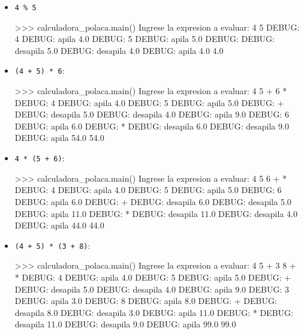 \begin{itemize}
\item \verb|4 % 5|
\begin{codigo-python-sn}
>>> calculadora_polaca.main()
Ingrese la expresion a evaluar: 4 5 %
DEBUG: 4
DEBUG: apila  4.0
DEBUG: 5
DEBUG: apila  5.0
DEBUG: %
DEBUG: desapila  5.0
DEBUG: desapila  4.0
DEBUG: apila  4.0
4.0
\end{codigo-python-sn}

\item \verb|(4 + 5) * 6|:

\begin{codigo-python-sn}
>>> calculadora_polaca.main()
Ingrese la expresion a evaluar: 4 5 + 6 *
DEBUG: 4
DEBUG: apila  4.0
DEBUG: 5
DEBUG: apila  5.0
DEBUG: +
DEBUG: desapila  5.0
DEBUG: desapila  4.0
DEBUG: apila  9.0
DEBUG: 6
DEBUG: apila  6.0
DEBUG: *
DEBUG: desapila  6.0
DEBUG: desapila  9.0
DEBUG: apila  54.0
54.0
\end{codigo-python-sn}

\item \verb|4 * (5 + 6)|:

\begin{codigo-python-sn}
>>> calculadora_polaca.main()
Ingrese la expresion a evaluar: 4 5 6 + *
DEBUG: 4
DEBUG: apila  4.0
DEBUG: 5
DEBUG: apila  5.0
DEBUG: 6
DEBUG: apila  6.0
DEBUG: +
DEBUG: desapila  6.0
DEBUG: desapila  5.0
DEBUG: apila  11.0
DEBUG: *
DEBUG: desapila  11.0
DEBUG: desapila  4.0
DEBUG: apila  44.0
44.0
\end{codigo-python-sn}

\item \verb|(4 + 5) * (3 + 8)|:

\begin{codigo-python-sn}
>>> calculadora_polaca.main()
Ingrese la expresion a evaluar: 4 5 + 3 8 + *
DEBUG: 4
DEBUG: apila  4.0
DEBUG: 5
DEBUG: apila  5.0
DEBUG: +
DEBUG: desapila  5.0
DEBUG: desapila  4.0
DEBUG: apila  9.0
DEBUG: 3
DEBUG: apila  3.0
DEBUG: 8
DEBUG: apila  8.0
DEBUG: +
DEBUG: desapila  8.0
DEBUG: desapila  3.0
DEBUG: apila  11.0
DEBUG: *
DEBUG: desapila  11.0
DEBUG: desapila  9.0
DEBUG: apila  99.0
99.0
\end{codigo-python-sn}

\end{itemize}


